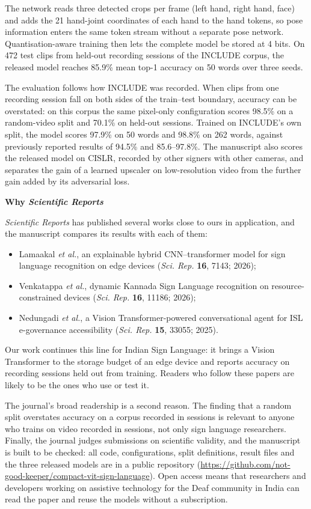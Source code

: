 \documentclass[11pt,a4paper]{article}
\begin{document}
The network reads three detected crops per frame (left hand, right hand, face) and adds the 21 hand-joint coordinates of each hand to the hand tokens, so pose information enters the same token stream without a separate pose network. Quantisation-aware training then lets the complete model be stored at 4 bits. On 472 test clips from held-out recording sessions of the INCLUDE corpus, the released model reaches 85.9\% mean top-1 accuracy on 50 words over three seeds.

The evaluation follows how INCLUDE was recorded. When clips from one recording session fall on both sides of the train--test boundary, accuracy can be overstated: on this corpus the same pixel-only configuration scores 98.5\% on a random-video split and 70.1\% on held-out sessions. Trained on INCLUDE's own split, the model scores 97.9\% on 50 words and 98.8\% on 262 words, against previously reported results of 94.5\% and 85.6--97.8\%. The manuscript also scores the released model on CISLR, recorded by other signers with other cameras, and separates the gain of a learned upscaler on low-resolution video from the further gain added by its adversarial loss.

\textbf{Why \textit{Scientific Reports}}

\textit{Scientific Reports} has published several works close to ours in application, and the manuscript compares its results with each of them:
\begin{itemize}\setlength{\itemsep}{1pt}\setlength{\parskip}{0pt}
\item Lamaakal \textit{et al.}, an explainable hybrid CNN--transformer model for sign language recognition on edge devices (\textit{Sci. Rep.} \textbf{16}, 7143; 2026);
\item Venkatappa \textit{et al.}, dynamic Kannada Sign Language recognition on resource-constrained devices (\textit{Sci. Rep.} \textbf{16}, 11186; 2026);
\item Nedungadi \textit{et al.}, a Vision Transformer-powered conversational agent for ISL e-governance accessibility (\textit{Sci. Rep.} \textbf{15}, 33055; 2025).
\end{itemize}
Our work continues this line for Indian Sign Language: it brings a Vision Transformer to the storage budget of an edge device and reports accuracy on recording sessions held out from training. Readers who follow these papers are likely to be the ones who use or test it.

The journal's broad readership is a second reason. The finding that a random split overstates accuracy on a corpus recorded in sessions is relevant to anyone who trains on video recorded in sessions, not only sign language researchers. Finally, the journal judges submissions on scientific validity, and the manuscript is built to be checked: all code, configurations, split definitions, result files and the three released models are in a public repository (\url{https://github.com/not-good-keeper/compact-vit-sign-language}). Open access means that researchers and developers working on assistive technology for the Deaf community in India can read the paper and reuse the models without a subscription.
\end{document}
